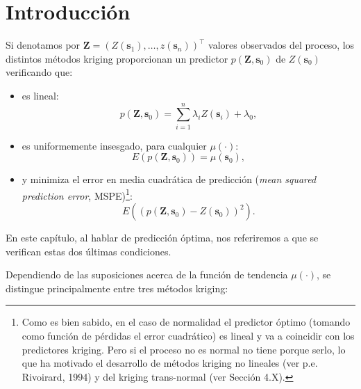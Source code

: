 \documentclass[
  spanish,
]{book}
\theoremstyle{break}
\theoremstyle{definition}
\theoremstyle{definition}
\theoremstyle{definition}
\theoremstyle{definition}
\theoremstyle{remark}
\begin{document}
\hypertarget{introduccion}{%
\section{Introducción}\label{introduccion}}

Si denotamos por \(\mathbf{Z}=\left( Z(\mathbf{s}_{1}), \ldots, z(\mathbf{s}_{n} )\right)^\top\) valores observados del proceso, los distintos métodos kriging proporcionan un predictor \(p(\mathbf{Z},\mathbf{s}_{0})\) de \(Z(\mathbf{s}_{0})\) verificando que:

\begin{itemize}
\item
  es lineal:
  \[p(\mathbf{Z},\mathbf{s}_{0})=\sum\limits_{i=1}^{n}\lambda_{i} Z(\mathbf{s}_{i}) +\lambda_{0},\]
\item
  es uniformemente insesgado, para cualquier \(\mu(\cdot)\):
  \[E(p(\mathbf{Z},\mathbf{s}_{0}))=\mu(\mathbf{s}_{0}),\]
\item
  y minimiza el error en media cuadrática de predicción (\emph{mean squared prediction error}, MSPE)\footnote{Como es bien sabido, en el caso de normalidad el predictor óptimo (tomando como función de pérdidas el error cuadrático) es lineal y va a coincidir con los predictores kriging. Pero si el proceso no es normal no tiene porque serlo, lo que ha motivado el desarrollo de métodos kriging no lineales (ver p.e. Rivoirard, 1994) y del kriging trans-normal (ver Sección 4.X).}:
  \[E\left( \left( p(\mathbf{Z},\mathbf{s}_{0})-Z(\mathbf{s}_{0})\right)^2 \right).\]
\end{itemize}

En este capítulo, al hablar de predicción óptima, nos referiremos a que se verifican estas dos últimas condiciones.

Dependiendo de las suposiciones acerca de la función de tendencia \(\mu(\cdot)\), se distingue principalmente entre tres métodos kriging:
\end{document}
